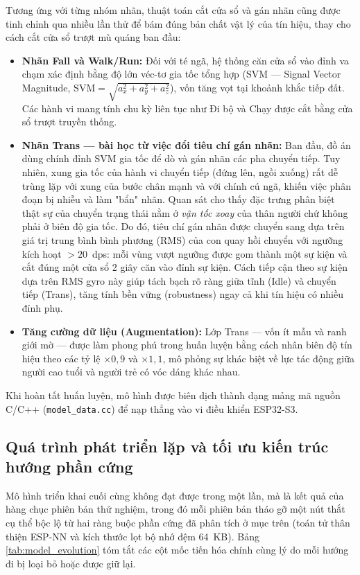 \documentclass[../DoAn.tex]{subfiles}
\begin{document}
Tương ứng với từng nhóm nhãn, thuật toán cắt cửa sổ và gán nhãn cũng được tinh chỉnh qua nhiều lần thử để bám đúng bản chất vật lý của tín hiệu, thay cho cách cắt cửa sổ trượt mù quáng ban đầu:
\begin{itemize}
    \item \textbf{Nhãn Fall và Walk/Run:} Đối với té ngã, hệ thống căn cửa sổ vào đỉnh va chạm xác định bằng độ lớn véc-tơ gia tốc tổng hợp (SVM --- Signal Vector Magnitude, $\text{SVM} = \sqrt{a_x^2 + a_y^2 + a_z^2}$), vốn tăng vọt tại khoảnh khắc tiếp đất. Các hành vi mang tính chu kỳ liên tục như Đi bộ và Chạy được cắt bằng cửa sổ trượt truyền thống.
    \item \textbf{Nhãn Trans --- bài học từ việc đổi tiêu chí gán nhãn:} Ban đầu, đồ án dùng chính đỉnh SVM gia tốc để dò và gán nhãn các pha chuyển tiếp. Tuy nhiên, xung gia tốc của hành vi chuyển tiếp (đứng lên, ngồi xuống) rất dễ trùng lặp với xung của bước chân mạnh và với chính cú ngã, khiến việc phân đoạn bị nhiễu và làm "bẩn" nhãn. Quan sát cho thấy đặc trưng phân biệt thật sự của chuyển trạng thái nằm ở \textit{vận tốc xoay} của thân người chứ không phải ở biên độ gia tốc. Do đó, tiêu chí gán nhãn được chuyển sang dựa trên giá trị trung bình bình phương (RMS) của con quay hồi chuyển với ngưỡng kích hoạt $> 20$~dps: mỗi vùng vượt ngưỡng được gom thành một sự kiện và cắt đúng một cửa sổ 2 giây căn vào đỉnh sự kiện. Cách tiếp cận theo sự kiện dựa trên RMS gyro này giúp tách bạch rõ ràng giữa tĩnh (Idle) và chuyển tiếp (Trans), tăng tính bền vững (robustness) ngay cả khi tín hiệu có nhiều đỉnh phụ.
    \item \textbf{Tăng cường dữ liệu (Augmentation):} Lớp Trans --- vốn ít mẫu và ranh giới mờ --- được làm phong phú trong huấn luyện bằng cách nhân biên độ tín hiệu theo các tỷ lệ $\times 0{,}9$ và $\times 1{,}1$, mô phỏng sự khác biệt về lực tác động giữa người cao tuổi và người trẻ có vóc dáng khác nhau.
\end{itemize}

Khi hoàn tất huấn luyện, mô hình được biên dịch thành dạng mảng mã nguồn C/C++ (\texttt{model\_data.cc}) để nạp thẳng vào vi điều khiển ESP32-S3.

\subsection{Quá trình phát triển lặp và tối ưu kiến trúc hướng phần cứng}
Mô hình triển khai cuối cùng không đạt được trong một lần, mà là kết quả của hàng chục phiên bản thử nghiệm, trong đó mỗi phiên bản tháo gỡ một nút thắt cụ thể bộc lộ từ hai ràng buộc phần cứng đã phân tích ở mục trên (toán tử thân thiện ESP-NN và kích thước lọt bộ nhớ đệm 64~KB). Bảng \ref{tab:model_evolution} tóm tắt các cột mốc tiến hóa chính cùng lý do mỗi hướng đi bị loại bỏ hoặc được giữ lại.
\end{document}

